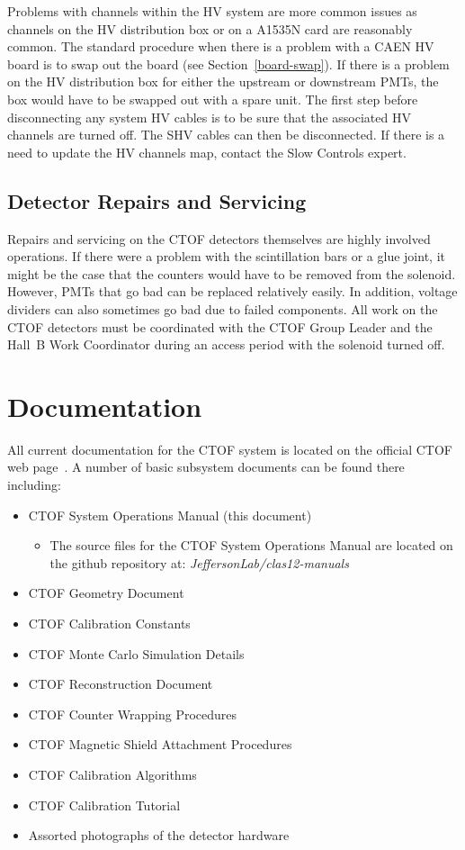 \documentclass[12pt]{article}
\begin{document}
Problems with channels within the HV system are more common issues as channels on 
the HV distribution box or on a A1535N card are reasonably common. The standard 
procedure when there is a problem with a CAEN HV board is to swap out the board 
(see Section~\ref{board-swap}). If there is a problem on the HV distribution box 
for either the upstream or downstream PMTs, the box would have to be swapped out 
with a spare unit. The first step before disconnecting any system HV cables is to 
be sure that the associated HV channels are turned off. The SHV cables can then be 
disconnected. If there is a need to update the HV channels map, contact the Slow 
Controls expert.

\subsection{Detector Repairs and Servicing}

Repairs and servicing on the CTOF detectors themselves are highly involved operations. 
If there were a problem with the scintillation bars or a glue joint, it might be the 
case that the counters would have to be removed from the solenoid. However, PMTs that 
go bad can be replaced relatively easily. In addition, voltage dividers can also 
sometimes go bad due to failed components. All work on the CTOF detectors must be 
coordinated with the CTOF Group Leader and the Hall~B Work Coordinator during an 
access period with the solenoid turned off.

\clearpage

\vfil
\eject

\section{Documentation}

All current documentation for the CTOF system is located on the official CTOF web 
page~\cite{ctof-web}. A number of basic subsystem documents can be found there 
including:

\begin{itemize}
\item CTOF System Operations Manual (this document)
 \begin{itemize}
   \item The source files for the CTOF System Operations Manual are located on the
         github repository at: {\it JeffersonLab/clas12-manuals}
 \end{itemize}
\item CTOF Geometry Document
\item CTOF Calibration Constants
\item CTOF Monte Carlo Simulation Details
\item CTOF Reconstruction Document
\item CTOF Counter Wrapping Procedures
\item CTOF Magnetic Shield Attachment Procedures
\item CTOF Calibration Algorithms
\item CTOF Calibration Tutorial
\item Assorted photographs of the detector hardware
\end{itemize}
\end{document}
